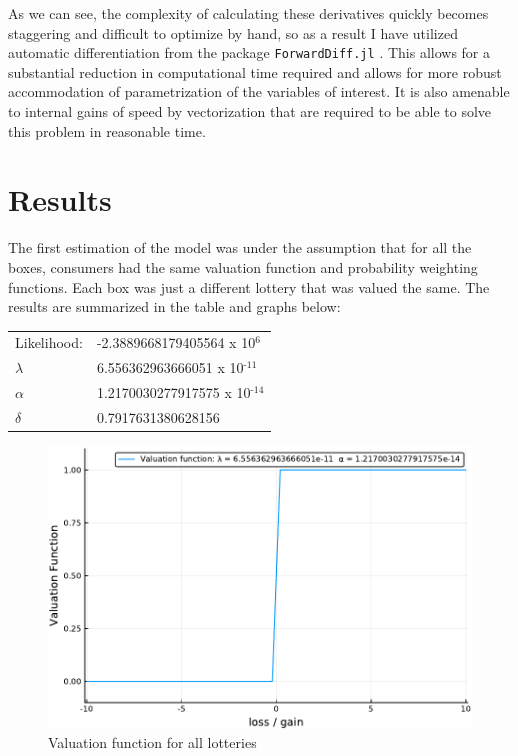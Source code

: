 \documentclass[12pt, letterpaper]{paper}
\begin{document}
As we can see, the complexity of calculating these derivatives quickly
becomes staggering and difficult to optimize by hand, so as a result I
have utilized automatic differentiation from the package
\texttt{ForwardDiff.jl} \cite{ForwardDiff}. This allows for a substantial
reduction in computational time required and allows for more robust
accommodation of parametrization of the variables of interest. It is also
amenable to internal gains of speed by vectorization that are required
to be able to solve this problem in reasonable time.

\section{Results}
\label{sec-5}

The first estimation of the model was under the assumption that for
all the boxes, consumers had the same valuation function and
probability weighting functions. Each box was just a different lottery
that was valued the same. The results are summarized in the table and graphs below:


\begin{center}
\begin{tabular}{ll}
Likelihood: & -2.3889668179405564 x 10$^{\text{6}}$\\
$\lambda$ & 6.556362963666051 x 10$^{\text{-11}}$\\
$\alpha$ & 1.2170030277917575 x 10$^{\text{-14}}$\\
$\delta$ & 0.7917631380628156\\
\end{tabular}
\end{center}

\begin{figure}[htb]
\centering
\includegraphics[width=.9\linewidth]{../Scripts/ValuationSingle.pdf}
\caption{\label{fig:single-valuation}Valuation function for all lotteries}
\end{figure}
\end{document}
